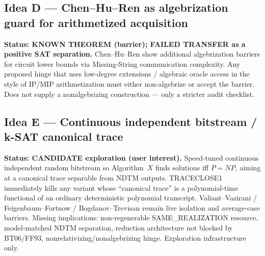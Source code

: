 \documentclass[11pt]{article}
\begin{document}
\subsection*{Idea D --- Chen--Hu--Ren as algebrization guard for arithmetized acquisition}
\textbf{Status: KNOWN THEOREM (barrier); FAILED TRANSFER as a positive SAT separation.}
Chen--Hu--Ren show additional algebrization barriers for circuit lower bounds via Missing-String
communication complexity. Any proposed hinge that uses low-degree extensions / algebraic oracle
access in the style of IP/MIP arithmetization must either non-algebrize or accept the barrier.
Does not supply a nonalgebrizing construction --- only a stricter audit checklist.

\subsection*{Idea E --- Continuous independent bitstream / k-SAT canonical trace}
\textbf{Status: CANDIDATE exploration (user interest).}
Speed-tuned continuous independent random bitstream so Algorithm~$X$ finds solutions iff $P=NP$,
aiming at a canonical trace separable from NDTM outputs. TRACECLOSE1 immediately kills any
variant whose ``canonical trace'' is a polynomial-time functional of an ordinary deterministic
polynomial transcript. Valiant--Vazirani / Feigenbaum--Fortnow / Bogdanov--Trevisan remain live
isolation and average-case barriers. Missing implications: non-regenerable SAME\_REALIZATION
resource, model-matched NDTM separation, reduction architecture not blocked by BT06/FF93,
nonrelativizing/nonalgebrizing hinge. Exploration infrastructure only.
\end{document}
